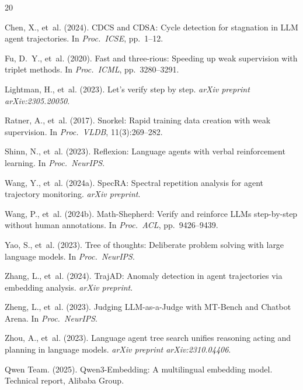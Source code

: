 \documentclass[11pt]{article}
\begin{document}
\begin{thebibliography}{20}

Chen, X., et~al. (2024).
\newblock CDCS and CDSA: Cycle detection for stagnation in LLM agent trajectories.
\newblock In \emph{Proc.\ ICSE}, pp.\ 1--12.

Fu, D.~Y., et~al. (2020).
\newblock Fast and three-rious: Speeding up weak supervision with triplet methods.
\newblock In \emph{Proc.\ ICML}, pp.\ 3280--3291.

Lightman, H., et~al. (2023).
\newblock Let's verify step by step.
\newblock \emph{arXiv preprint arXiv:2305.20050}.

Ratner, A., et~al. (2017).
\newblock Snorkel: Rapid training data creation with weak supervision.
\newblock In \emph{Proc.\ VLDB}, 11(3):269--282.

Shinn, N., et~al. (2023).
\newblock Reflexion: Language agents with verbal reinforcement learning.
\newblock In \emph{Proc.\ NeurIPS}.

Wang, Y., et~al. (2024a).
\newblock SpecRA: Spectral repetition analysis for agent trajectory monitoring.
\newblock \emph{arXiv preprint}.

Wang, P., et~al. (2024b).
\newblock Math-Shepherd: Verify and reinforce LLMs step-by-step without human annotations.
\newblock In \emph{Proc.\ ACL}, pp.\ 9426--9439.

Yao, S., et~al. (2023).
\newblock Tree of thoughts: Deliberate problem solving with large language models.
\newblock In \emph{Proc.\ NeurIPS}.

Zhang, L., et~al. (2024).
\newblock TrajAD: Anomaly detection in agent trajectories via embedding analysis.
\newblock \emph{arXiv preprint}.

Zheng, L., et~al. (2023).
\newblock Judging LLM-as-a-Judge with MT-Bench and Chatbot Arena.
\newblock In \emph{Proc.\ NeurIPS}.

Zhou, A., et~al. (2023).
\newblock Language agent tree search unifies reasoning acting and planning in language models.
\newblock \emph{arXiv preprint arXiv:2310.04406}.

Qwen Team. (2025).
\newblock Qwen3-Embedding: A multilingual embedding model.
\newblock Technical report, Alibaba Group.

\end{thebibliography}
\end{document}
